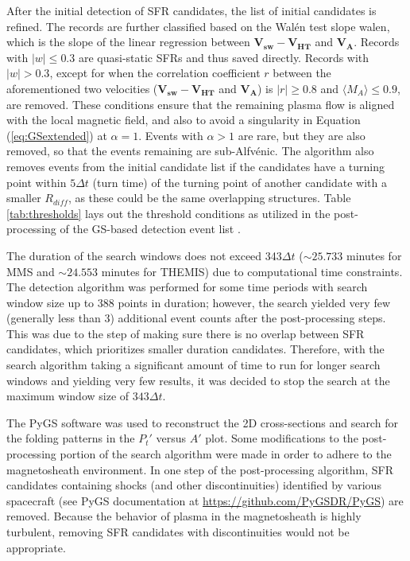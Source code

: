 After the initial detection of SFR candidates, the list of initial candidates is refined. The records are further classified based on the Wal\'en test slope \gls{walen}, which is the slope of the linear regression between $\mathbf{V_{sw}} - \mathbf{V_{HT}}$ and $\mathbf{V_A}$. Records with $|w|\leq0.3$ are quasi-static SFRs and thus saved directly. Records with $|w|>0.3$, except for when the correlation coefficient $r$ between the aforementioned two velocities ($\mathbf{V_{sw}} - \mathbf{V_{HT}}$ and $\mathbf{V_A}$) is $|r|\geq 0.8$ and $\langle M_A\rangle \leq 0.9$, are removed. These conditions ensure that the remaining plasma flow is aligned with the local magnetic field, and also to avoid a singularity in Equation (\ref{eq:GSextended}) at $\alpha=1$. Events with $\alpha>1$ are rare, but they are also removed, so that the events remaining are sub-Alfv\'enic. The algorithm also removes events from the initial candidate list if the candidates have a turning point within $5\Delta t$ (turn time) of the turning point of another candidate with a smaller $R_{diff}$, as these could be the same overlapping structures. Table \ref{tab:thresholds} lays out the threshold conditions as utilized in the post-processing of the GS-based detection event list \citep{Chen:2020, Chen:2021, Chen:2022}.

The duration of the search windows does not exceed 343$\Delta t$ ($\sim25.733$ minutes for MMS and $\sim24.553$ minutes for THEMIS) due to computational time constraints. The detection algorithm was performed for some time periods with search window size up to 388 points in duration; however, the search yielded very few (generally less than 3) additional event counts after the post-processing steps. This was due to the step of making sure there is no overlap between SFR candidates, which prioritizes smaller duration candidates. Therefore, with the search algorithm taking a significant amount of time to run for longer search windows and yielding very few results, it was decided to stop the search at the maximum window size of $343\Delta t$.

The PyGS software \citep{Zheng:2018, Hu:2018, Chen:2022, Sonnerup:1996, Hau:1999, HuSonnerup:2002} was used to reconstruct the 2D cross-sections and search for the folding patterns in the $P_t'$ versus $A'$ plot. Some modifications to the post-processing portion of the search algorithm were made in order to adhere to the magnetosheath environment. In one step of the post-processing algorithm, SFR candidates containing shocks (and other discontinuities) identified by various spacecraft (see PyGS documentation at \url{https://github.com/PyGSDR/PyGS}) are removed. Because the behavior of plasma in the magnetosheath is highly turbulent, removing SFR candidates with discontinuities would not be appropriate.

